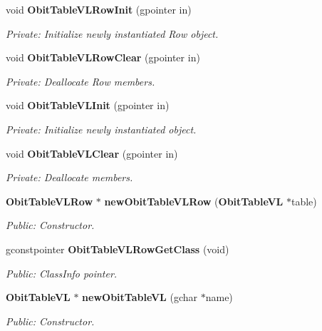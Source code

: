 \begin{CompactItemize}
\item 
void {\bf Obit\-Table\-VLRow\-Init} (gpointer in)
\begin{CompactList}\small\item\em Private: Initialize newly instantiated Row object. \item\end{CompactList}\item 
void {\bf Obit\-Table\-VLRow\-Clear} (gpointer in)
\begin{CompactList}\small\item\em Private: Deallocate Row members. \item\end{CompactList}\item 
void {\bf Obit\-Table\-VLInit} (gpointer in)
\begin{CompactList}\small\item\em Private: Initialize newly instantiated object. \item\end{CompactList}\item 
void {\bf Obit\-Table\-VLClear} (gpointer in)
\begin{CompactList}\small\item\em Private: Deallocate members. \item\end{CompactList}\item 
{\bf Obit\-Table\-VLRow} $\ast$ {\bf new\-Obit\-Table\-VLRow} ({\bf Obit\-Table\-VL} $\ast$table)
\begin{CompactList}\small\item\em Public: Constructor. \item\end{CompactList}\item 
gconstpointer {\bf Obit\-Table\-VLRow\-Get\-Class} (void)
\begin{CompactList}\small\item\em Public: Class\-Info pointer. \item\end{CompactList}\item 
{\bf Obit\-Table\-VL} $\ast$ {\bf new\-Obit\-Table\-VL} (gchar $\ast$name)
\begin{CompactList}\small\item\em Public: Constructor. \item\end{CompactList}\item 

\end{CompactItemize}
